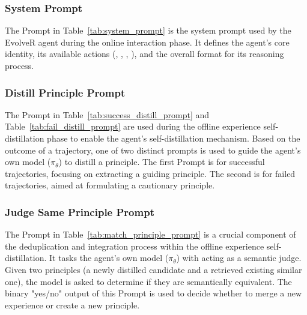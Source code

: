 \subsubsection{System Prompt}
The Prompt in Table~\ref{tab:system_prompt} is the system prompt used by the EvolveR agent during the online interaction phase. It defines the agent's core identity, its available actions (, , , ), and the overall format for its reasoning process.



\subsubsection{Distill Principle Prompt}
The Prompt in Table~\ref{tab:success_distill_prompt} and Table~\ref{tab:fail_distill_prompt} are used during the offline experience self-distillation phase to enable the agent's self-distillation mechanism. Based on the outcome of a trajectory, one of two distinct prompts is used to guide the agent's own model ($\pi_\theta$) to distill a principle. The first Prompt is for successful trajectories, focusing on extracting a guiding principle. The second is for failed trajectories, aimed at formulating a cautionary principle.


\subsubsection{Judge Same Principle Prompt}
The Prompt in Table~\ref{tab:match_principle_prompt} is a crucial component of the deduplication and integration process within the offline experience self-distillation. It tasks the agent's own model ($\pi_\theta$) with acting as a semantic judge. Given two principles (a newly distilled candidate and a retrieved existing similar one), the model is asked to determine if they are semantically equivalent. The binary "yes/no" output of this Prompt is used to decide whether to merge a new experience or create a new principle.






